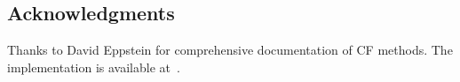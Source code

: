\documentclass[11pt]{article}
\theoremstyle{definition}
\theoremstyle{remark}
\begin{document}
\subsection*{Acknowledgments}
Thanks to David Eppstein for comprehensive documentation of CF methods.
The implementation is available at~\cite{egypt-repo}.



\end{document}
